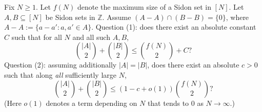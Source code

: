 Fix $N\ge 1$. Let $f(N)$ denote the maximum size of a Sidon set in $[N]$.
Let $A,B\subseteq [N]$ be Sidon sets in $\mathbb{Z}$.
Assume $(A-A)\cap (B-B)=\{0\}$, where $A-A:=\{a-a':a,a'\in A\}$.
Question (1): does there exist an absolute constant $C$ such that for all $N$ and all such $A,B$,
\[
\binom{|A|}{2}+\binom{|B|}{2} \le \binom{f(N)}{2}+C?
\]
Question (2): assuming additionally $|A|=|B|$, does there exist an absolute $c>0$ such that along \emph{all} sufficiently large $N$,
\[
\binom{|A|}{2}+\binom{|B|}{2} \le (1-c+o(1))\binom{f(N)}{2}?
\]
(Here $o(1)$ denotes a term depending on $N$ that tends to $0$ as $N\to\infty$.)
